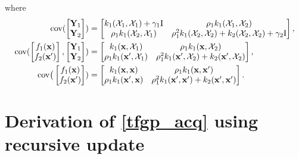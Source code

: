\documentclass[11pt]{article}
\begin{document}
where
\begin{align}
    \rm{cov}( \begin{bmatrix} \mathbf{Y}_1 \\ \mathbf{Y}_2 \end{bmatrix})
    & = 
    \begin{bmatrix}
    k_1(\mathcal{X}_1,\mathcal{X}_1) + \gamma_1 \mathrm{I} & \rho_1 k_1(\mathcal{X}_1,\mathcal{X}_2) \\
    \rho_1 k_1(\mathcal{X}_2,\mathcal{X}_1) & \rho_1^2 k_1(\mathcal{X}_2,\mathcal{X}_2) + k_2(\mathcal{X}_2,\mathcal{X}_2) + \gamma_2 \mathrm{I}
    \end{bmatrix},
\\
    \rm{cov}( \begin{bmatrix} f_1(\mathbf{x}) \\ f_2(\mathbf{x}') \end{bmatrix}, \begin{bmatrix} \mathbf{Y}_1 \\ \mathbf{Y}_2 \end{bmatrix}) 
    & = 
    \begin{bmatrix} k_1(\mathbf{x}, \mathcal{X}_1) &  \rho_1 k_1(\mathbf{x}, \mathcal{X}_2) \\  \rho_1 k_1(\mathbf{x}', \mathcal{X}_1)  & \rho_1^2 k_1(\mathbf{x}', \mathcal{X}_2) + k_2(\mathbf{x}', \mathcal{X}_2) 
    \end{bmatrix}, 
\\
    {\rm{cov}}\big(\begin{bmatrix} f_1(\mathbf{x}) \\ f_2(\mathbf{x}') \end{bmatrix})
    & = 
    \begin{bmatrix} k_1(\mathbf{x}, \mathbf{x}) &  \rho_1 k_1(\mathbf{x}, \mathbf{x}') \\  \rho_1 k_1(\mathbf{x}', \mathbf{x})  & \rho_1^2 k_1(\mathbf{x}', \mathbf{x}') + k_2(\mathbf{x}', \mathbf{x}') 
    \end{bmatrix}. 
\end{align}



\section{Derivation of \eqref{tfgp_acq} using recursive update}
\end{document}
